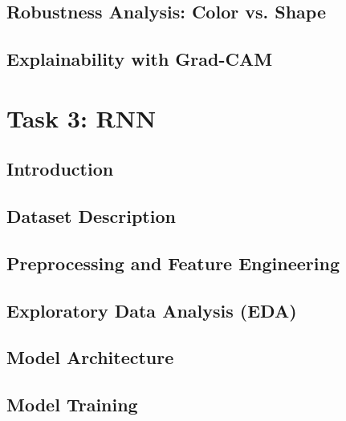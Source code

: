 \documentclass[a4paper,12pt]{extarticle}
\begin{document}
\subsection{Robustness Analysis: Color vs. Shape}

\subsection{Explainability with Grad-CAM}

\clearpage

\section{Task 3: RNN}

\subsection{Introduction}

\subsection{Dataset Description}

\subsection{Preprocessing and Feature Engineering}

\subsection{Exploratory Data Analysis (EDA)}

\subsection{Model Architecture}

\subsection{Model Training}
\end{document}
